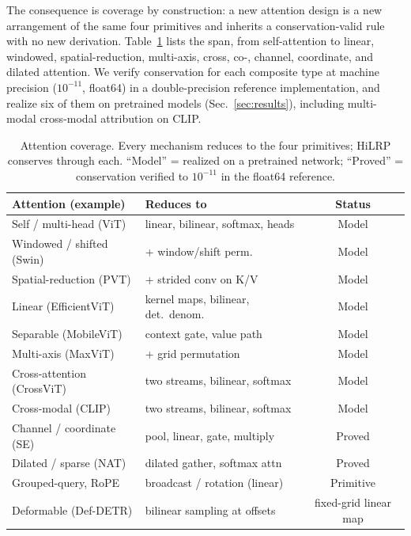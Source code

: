 \documentclass[lettersize,journal]{IEEEtran}
\begin{document}
The consequence is coverage by construction: a new attention design is a new arrangement of the same four primitives and inherits a conservation-valid rule with no new derivation. Table~\ref{tab:attn-coverage} lists the span, from self-attention to linear, windowed, spatial-reduction, multi-axis, cross, co-, channel, coordinate, and dilated attention. We verify conservation for each composite type at machine precision ($10^{-11}$, float64) in a double-precision reference implementation, and realize six of them on pretrained models (Sec.~\ref{sec:results}), including multi-modal cross-modal attribution on CLIP.

\begin{table}[h]
  \centering
  \caption{Attention coverage. Every mechanism reduces to the four primitives; HiLRP conserves through each. ``Model'' = realized on a pretrained network; ``Proved'' = conservation verified to $10^{-11}$ in the float64 reference.}
  \label{tab:attn-coverage}
  \setlength{\tabcolsep}{4pt}
  \footnotesize
  \begin{tabular}{l l c}
    \toprule
    Attention (example) & Reduces to & Status \\
    \midrule
    Self / multi-head (ViT) & linear, bilinear, softmax, heads & Model \\
    Windowed / shifted (Swin) & \;\; + window/shift perm. & Model \\
    Spatial-reduction (PVT) & \;\; + strided conv on K/V & Model \\
    Linear (EfficientViT) & kernel maps, bilinear, det.\ denom. & Model \\
    Separable (MobileViT) & context gate, value path & Model \\
    Multi-axis (MaxViT) & \;\; + grid permutation & Model \\
    Cross-attention (CrossViT) & two streams, bilinear, softmax & Model \\
    Cross-modal (CLIP) & two streams, bilinear, softmax & Model \\
    Channel / coordinate (SE) & pool, linear, gate, multiply & Proved \\
    Dilated / sparse (NAT) & dilated gather, softmax attn & Proved \\
    Grouped-query, RoPE & broadcast / rotation (linear) & Primitive \\
    Deformable (Def-DETR) & bilinear sampling at offsets & fixed-grid linear map \\
    \bottomrule
  \end{tabular}
\end{table}
\end{document}
